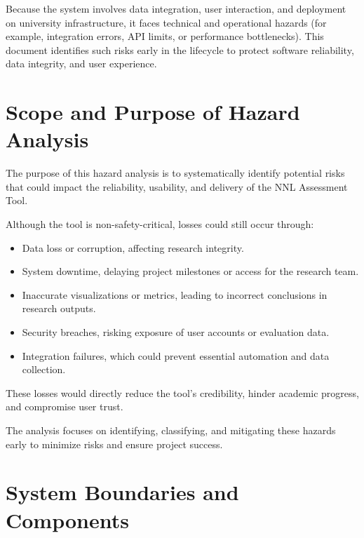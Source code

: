 \documentclass{article}
\begin{document}
Because the system involves data integration, user interaction, and deployment
on university infrastructure, it faces technical and operational hazards (for
example, integration errors, API limits, or performance bottlenecks). This
document identifies such risks early in the lifecycle to protect software
reliability, data integrity, and user experience.

\section{Scope and Purpose of Hazard Analysis}

The purpose of this hazard analysis is to systematically identify potential
risks that could impact the reliability, usability, and delivery of the NNL
Assessment Tool.

Although the tool is non-safety-critical, losses could still occur through:

\begin{itemize}
    \item Data loss or corruption, affecting research integrity.
    \item System downtime, delaying project milestones or access for the research team.
    \item Inaccurate visualizations or metrics, leading to incorrect conclusions in research outputs.
    \item Security breaches, risking exposure of user accounts or evaluation data.
    \item Integration failures, which could prevent essential automation and data collection.
\end{itemize}

These losses would directly reduce the tool’s credibility, hinder academic
progress, and compromise user trust.

The analysis focuses on identifying, classifying, and mitigating these hazards
early to minimize risks and ensure project success.

\section{System Boundaries and Components}
\end{document}
